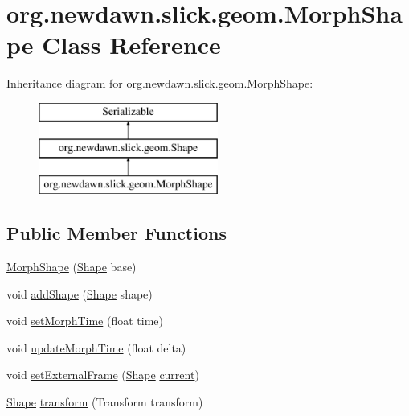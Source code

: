 \hypertarget{classorg_1_1newdawn_1_1slick_1_1geom_1_1_morph_shape}{}\section{org.\+newdawn.\+slick.\+geom.\+Morph\+Shape Class Reference}
\label{classorg_1_1newdawn_1_1slick_1_1geom_1_1_morph_shape}
Inheritance diagram for org.\+newdawn.\+slick.\+geom.\+Morph\+Shape\+:\begin{figure}[H]
\begin{center}
\leavevmode
\includegraphics[height=3.000000cm]{classorg_1_1newdawn_1_1slick_1_1geom_1_1_morph_shape}
\end{center}
\end{figure}
\subsection*{Public Member Functions}
\begin{DoxyCompactItemize}
\item 
\mbox{\hyperlink{classorg_1_1newdawn_1_1slick_1_1geom_1_1_morph_shape_a06a4bb0708992bfbcd849ce0a4437f32}{Morph\+Shape}} (\mbox{\hyperlink{classorg_1_1newdawn_1_1slick_1_1geom_1_1_shape}{Shape}} base)
\item 
void \mbox{\hyperlink{classorg_1_1newdawn_1_1slick_1_1geom_1_1_morph_shape_a3f052286d029f6277988a385cc633a68}{add\+Shape}} (\mbox{\hyperlink{classorg_1_1newdawn_1_1slick_1_1geom_1_1_shape}{Shape}} shape)
\item 
void \mbox{\hyperlink{classorg_1_1newdawn_1_1slick_1_1geom_1_1_morph_shape_add1fba81944fe0dfd474ae7f5f808f64}{set\+Morph\+Time}} (float time)
\item 
void \mbox{\hyperlink{classorg_1_1newdawn_1_1slick_1_1geom_1_1_morph_shape_afc0521e77e821a34363c87725b5fd3e8}{update\+Morph\+Time}} (float delta)
\item 
void \mbox{\hyperlink{classorg_1_1newdawn_1_1slick_1_1geom_1_1_morph_shape_ac053f4373e6ce3eaecee93d75c0a1260}{set\+External\+Frame}} (\mbox{\hyperlink{classorg_1_1newdawn_1_1slick_1_1geom_1_1_shape}{Shape}} \mbox{\hyperlink{classorg_1_1newdawn_1_1slick_1_1geom_1_1_morph_shape_adc35bd32e88974946c096e273b648575}{current}})
\item 
\mbox{\hyperlink{classorg_1_1newdawn_1_1slick_1_1geom_1_1_shape}{Shape}} \mbox{\hyperlink{classorg_1_1newdawn_1_1slick_1_1geom_1_1_morph_shape_a4b172f77f9d468bbcca6b36849a51ed3}{transform}} (Transform transform)
\end{DoxyCompactItemize}
